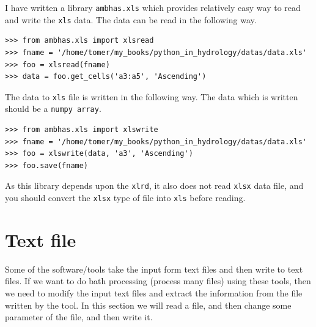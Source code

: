 \documentclass[10pt]{book}
\begin{document}
I have written a library \verb"ambhas.xls" which provides relatively easy way to read and write the \verb"xls" data. The data can be read in the following way. 
\beforeverb \begin{verbatim}
>>> from ambhas.xls import xlsread
>>> fname = '/home/tomer/my_books/python_in_hydrology/datas/data.xls'
>>> foo = xlsread(fname)
>>> data = foo.get_cells('a3:a5', 'Ascending')
\end{verbatim} \afterverb

The data to \verb"xls" file is written in the following way. The data which is written should be a \verb"numpy array".
\beforeverb \begin{verbatim}
>>> from ambhas.xls import xlswrite
>>> fname = '/home/tomer/my_books/python_in_hydrology/datas/data.xls'
>>> foo = xlswrite(data, 'a3', 'Ascending')
>>> foo.save(fname)
\end{verbatim} \afterverb
As this library depends upon the \verb"xlrd", it also does not read \verb"xlsx" data file, and you should convert the \verb"xlsx" type of file into \verb"xls" before reading.

\section{Text file}
Some of the software/tools take the input form text files and then write to text files. If we want to do bath processing (process many files) using these tools, then we need to modify the input text files and extract the information from the file written by the tool. In this section we will read a file, and then change some parameter of the file, and then write it.\\
\end{document}
